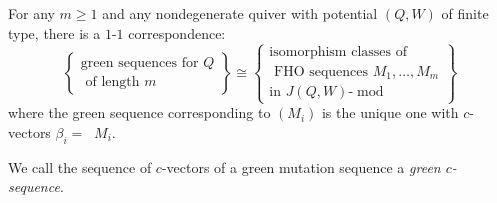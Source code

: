 \documentclass[ALCO,ThmDefs,Unicode,epreuves]{cedram}
\DeclareMathOperator{\undim}{\underline{dim}}
\DeclareMathOperator{\modr}{mod}
\begin{document}
\begin{theo}\label{thm: inductive thm implying main thm}
For any $m\ge1$ and any nondegenerate quiver with potential $(Q,W)$ of finite type, there is a $1$-$1$ correspondence:
\[
\left\{\begin{array}{c}
\text{green sequences for $Q$}\\
\text{ of length $m$}
\end{array}
\right\}\cong 
\left\{
\begin{array}{c}
\text{isomorphism classes of}\\
\text{ FHO sequences $M_1,\ldots,M_m$}\\
\text{in $J(Q,W)\text{-}\modr $}
\end{array}
\right\}
\]
where the green sequence corresponding to $(M_i)$ is the unique one with $c$-vectors $\beta_i=\undim M_i$.
\end{theo}

We call the sequence of $c$-vectors of a green mutation sequence a \emph{green $c$-sequence}.
\end{document}
